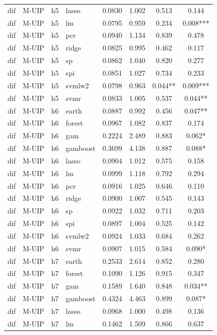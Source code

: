 \begin{ThreePartTable}
\begin{longtable}[t]{llclcccc}
dif & M-UIP & h5 & lasso & 0.0830 & 1.002 & 0.513 & 0.144\\
dif & M-UIP & h5 & lm & 0.0795 & 0.959 & 0.234 & 0.008***\\
dif & M-UIP & h5 & pcr & 0.0940 & 1.134 & 0.839 & 0.478\\
dif & M-UIP & h5 & ridge & 0.0825 & 0.995 & 0.462 & 0.117\\
dif & M-UIP & h5 & sp & 0.0862 & 1.040 & 0.820 & 0.277\\
dif & M-UIP & h5 & spi & 0.0851 & 1.027 & 0.734 & 0.233\\
dif & M-UIP & h5 & svmlw2 & 0.0798 & 0.963 & 0.044** & 0.009***\\
dif & M-UIP & h5 & svmr & 0.0833 & 1.005 & 0.537 & 0.044**\\
\addlinespace
dif & M-UIP & h6 & earth & 0.0887 & 0.992 & 0.456 & 0.047**\\
dif & M-UIP & h6 & forest & 0.0967 & 1.082 & 0.837 & 0.174\\
dif & M-UIP & h6 & gam & 0.2224 & 2.489 & 0.883 & 0.062*\\
dif & M-UIP & h6 & gamboost & 0.3699 & 4.138 & 0.887 & 0.088*\\
dif & M-UIP & h6 & lasso & 0.0904 & 1.012 & 0.575 & 0.158\\
dif & M-UIP & h6 & lm & 0.0999 & 1.118 & 0.792 & 0.294\\
dif & M-UIP & h6 & pcr & 0.0916 & 1.025 & 0.646 & 0.110\\
dif & M-UIP & h6 & ridge & 0.0900 & 1.007 & 0.545 & 0.143\\
dif & M-UIP & h6 & sp & 0.0922 & 1.032 & 0.711 & 0.203\\
dif & M-UIP & h6 & spi & 0.0897 & 1.004 & 0.525 & 0.142\\
dif & M-UIP & h6 & svmlw2 & 0.0924 & 1.033 & 0.684 & 0.262\\
dif & M-UIP & h6 & svmr & 0.0907 & 1.015 & 0.584 & 0.090*\\
\addlinespace
dif & M-UIP & h7 & earth & 0.2533 & 2.614 & 0.852 & 0.280\\
dif & M-UIP & h7 & forest & 0.1090 & 1.126 & 0.915 & 0.347\\
dif & M-UIP & h7 & gam & 0.1589 & 1.640 & 0.848 & 0.034**\\
dif & M-UIP & h7 & gamboost & 0.4324 & 4.463 & 0.899 & 0.087*\\
dif & M-UIP & h7 & lasso & 0.0968 & 1.000 & 0.498 & 0.136\\
dif & M-UIP & h7 & lm & 0.1462 & 1.509 & 0.866 & 0.637\\

\end{longtable}
\end{ThreePartTable}
